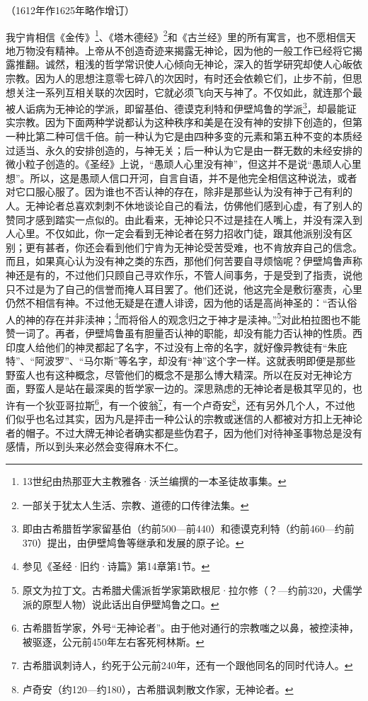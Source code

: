 \begin{center}
    （1612年作1625年略作增订）
\end{center}
\par 我宁肯相信《金传》\footnote{13世纪由热那亚大主教雅各·沃兰编撰的一本圣徒故事集。}、《塔木德经》\footnote{一部关于犹太人生活、宗教、道德的口传律法集。}和《古兰经》里的所有寓言，也不愿相信天地万物没有精神。上帝从不创造奇迹来揭露无神论，因为他的一般工作已经将它揭露推翻。诚然，粗浅的哲学常识使人心倾向无神论，深入的哲学研究却使人心皈依宗教。因为人的思想注意零七碎八的次因时，有时还会依赖它们，止步不前，但思想关注一系列互相关联的次因时，它就必须飞向天与神了。不仅如此，就连那个最被人诟病为无神论的学派，即留基伯、德谟克利特和伊壁鸠鲁的学派\footnote{即由古希腊哲学家留基伯（约前500—前440）和德谟克利特（约前460—约前370）提出，由伊壁鸠鲁等继承和发展的原子论。}，却最能证实宗教。因为下面两种学说都认为这种秩序和美是在没有神的安排下创造的，但第一种比第二种可信千倍。前一种认为它是由四种多变的元素和第五种不变的本质经过适当、永久的安排创造的，与神无关；后一种认为它是由一群无数的未经安排的微小粒子创造的。《圣经》上说，“愚顽人心里没有神”，但这并不是说“愚顽人心里想”。所以，这是愚顽人信口开河，自言自语，并不是他完全相信这种说法，或者对它口服心服了。因为谁也不否认神的存在，除非是那些认为没有神于己有利的人。无神论者总喜欢刺刺不休地谈论自己的看法，仿佛他们感到心虚，有了别人的赞同才感到踏实一点似的。由此看来，无神论只不过是挂在人嘴上，并没有深入到人心里。不仅如此，你一定会看到无神论者在努力招收门徒，跟其他派别没有区别；更有甚者，你还会看到他们宁肯为无神论受苦受难，也不肯放弃自己的信念。而且，如果真心认为没有神之类的东西，那他们何苦要自寻烦恼呢？伊壁鸠鲁声称神还是有的，不过他们只顾自己寻欢作乐，不管人间事务，于是受到了指责，说他只不过是为了自己的信誉而掩人耳目罢了。他们还说，他这完全是敷衍塞责，心里仍然不相信有神。不过他无疑是在遭人诽谤，因为他的话是高尚神圣的：“否认俗人的神的存在并非渎神；\footnote{参见《圣经·旧约·诗篇》第14章第1节。}而将俗人的观念归之于神才是渎神。”\footnote{原文为拉丁文。古希腊犬儒派哲学家第欧根尼·拉尔修（？—约前320，犬儒学派的原型人物）说此话出自伊壁鸠鲁之口。}对此柏拉图也不能赞一词了。再者，伊壁鸠鲁虽有胆量否认神的职能，却没有能力否认神的性质。西印度人给他们的神灵都起了名字，不过没有上帝的名字，就好像异教徒有“朱庇特”、“阿波罗”、“马尔斯”等名字，却没有“神”这个字一样。这就表明即便是那些野蛮人也有这种概念，尽管他们的概念不是那么博大精深。所以在反对无神论方面，野蛮人是站在最深奥的哲学家一边的。深思熟虑的无神论者是极其罕见的，也许有一个狄亚哥拉斯\footnote{古希腊哲学家，外号“无神论者”。由于他对通行的宗教嗤之以鼻，被控渎神，被驱逐，公元前450年左右客死柯林斯。}，有一个彼翁\footnote{古希腊讽刺诗人，约死于公元前240年，还有一个跟他同名的同时代诗人。}，有一个卢奇安\footnote{卢奇安（约120—约180），古希腊讽刺散文作家，无神论者。}，还有另外几个人，不过他们似乎也名过其实，因为凡是抨击一种公认的宗教或迷信的人都被对方扣上无神论者的帽子。不过大牌无神论者确实都是些伪君子，因为他们对待神圣事物总是没有感情，所以到头来必然会变得麻木不仁。
